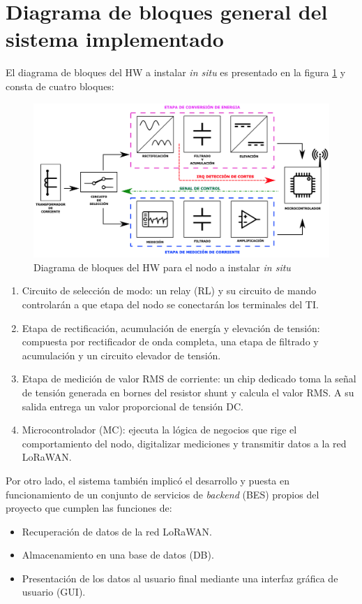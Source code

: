 \section{Diagrama de bloques general del sistema implementado}
El diagrama de bloques del HW a instalar \textit{in situ} es presentado en la figura \ref{fig:diagramadebloquesdelhw} y consta de cuatro bloques:
\begin{figure}[h!]
	\centering
	\includegraphics[width=0.7\linewidth]{Figures/diagrama_de_bloques_del_HW}
	\caption{Diagrama de bloques del HW para el nodo a instalar \textit{in situ}}
	\label{fig:diagramadebloquesdelhw}
\end{figure}
\begin{enumerate}
	\item Circuito de selección de modo: un relay (RL) y su circuito de mando controlarán a que etapa del nodo se conectarán los terminales del TI.
	\item Etapa de rectificación, acumulación de energía y elevación de tensión: compuesta por rectificador de onda completa, una etapa de filtrado y acumulación y un circuito elevador de tensión.
	\item Etapa de medición de valor RMS de corriente: un chip dedicado toma la señal de tensión generada en bornes del resistor shunt y calcula el valor RMS. A su salida entrega un valor proporcional de tensión DC.
	\item Microcontrolador (MC): ejecuta la lógica de negocios que rige el comportamiento del nodo, digitalizar mediciones y transmitir datos a la red LoRaWAN.
\end{enumerate}
Por otro lado, el sistema también implicó el desarrollo y puesta en funcionamiento de un conjunto de servicios de \textit{backend} (BES) propios del proyecto que cumplen las funciones de:
\begin{itemize}
	\item Recuperación de datos de la red LoRaWAN.
	\item Almacenamiento en una base de datos (DB).
	\item Presentación de los datos al usuario final mediante una interfaz gráfica de usuario (GUI).
\end{itemize}

